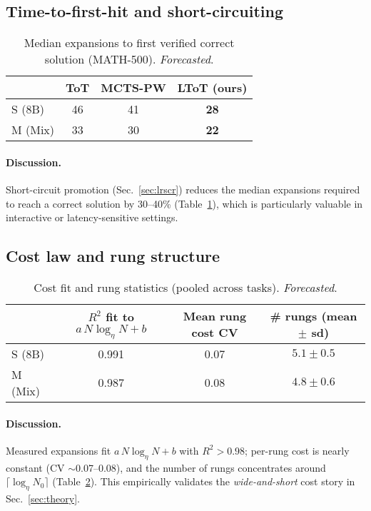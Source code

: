 \documentclass{article}
\begin{document}
\subsection{Time-to-first-hit and short-circuiting}
\label{subsec:ttfh}

\begin{table}[t]
\centering
\caption{Median expansions to first verified correct solution (MATH-500). \emph{Forecasted}.}
\vspace{0.3em}
\begin{tabular}{lccc}
\toprule
 & \textbf{ToT} & \textbf{MCTS-PW} & \textbf{LToT (ours)} \\
\midrule
S (8B)  & 46  & 41  & \textbf{28} \\
M (Mix) & 33  & 30  & \textbf{22} \\
\bottomrule
\end{tabular}
\label{tab:ttfh}
\end{table}

\paragraph{Discussion.}
Short-circuit promotion (Sec.~\ref{sec:lrscr}) reduces the median expansions required to reach a correct solution by 30--40\% (Table~\ref{tab:ttfh}), which is particularly valuable in interactive or latency-sensitive settings.

\subsection{Cost law and rung structure}
\label{subsec:cost-fit}

\begin{table}[t]
\centering
\caption{Cost fit and rung statistics (pooled across tasks). \emph{Forecasted}.}
\vspace{0.3em}
\begin{tabular}{lccc}
\toprule
 & \textbf{$R^2$ fit to $a\,N\log_\eta N{+}b$} & \textbf{Mean rung cost CV} & \textbf{\# rungs (mean $\pm$ sd)} \\
\midrule
S (8B)  & 0.991 & 0.07 & $5.1 \pm 0.5$ \\
M (Mix) & 0.987 & 0.08 & $4.8 \pm 0.6$ \\
\bottomrule
\end{tabular}
\label{tab:cost-fit}
\end{table}

\paragraph{Discussion.}
Measured expansions fit $a\,N\log_\eta N{+}b$ with $R^2{>}0.98$; per-rung cost is nearly constant (CV $\sim$0.07--0.08), and the number of rungs concentrates around $\lceil\log_\eta N_0\rceil$ (Table~\ref{tab:cost-fit}).
This empirically validates the \emph{wide-and-short} cost story in Sec.~\ref{sec:theory}.
\end{document}
